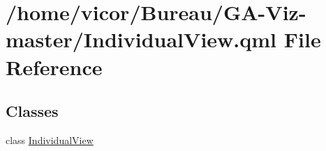 \hypertarget{_individual_view_8qml}{}\section{/home/vicor/\+Bureau/\+G\+A-\/\+Viz-\/master/\+Individual\+View.qml File Reference}
\label{_individual_view_8qml}
\subsection*{Classes}
\begin{DoxyCompactItemize}
\item 
class \hyperlink{class_individual_view}{Individual\+View}
\end{DoxyCompactItemize}
